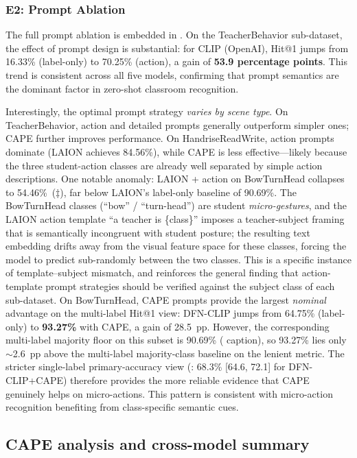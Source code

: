\documentclass[symmetry,article,submit,pdftex,moreauthors]{Definitions/mdpi}
\begin{document}
\subsubsection{E2: Prompt Ablation}
\label{sec:e2}

The full prompt ablation is embedded in .
On the TeacherBehavior sub-dataset, the effect of prompt design is substantial: for CLIP (OpenAI), Hit@1 jumps from 16.33\% (label-only) to 70.25\% (action), a gain of \textbf{53.9 percentage points}.
This trend is consistent across all five models, confirming that prompt semantics are the dominant factor in zero-shot classroom recognition.

Interestingly, the optimal prompt strategy \emph{varies by scene type}.
On TeacherBehavior, action and detailed prompts generally outperform simpler ones; CAPE further improves performance.
On HandriseReadWrite, action prompts dominate (LAION achieves 84.56\%), while CAPE is less effective---likely because the three student-action classes are already well separated by simple action descriptions.
One notable anomaly: LAION + action on BowTurnHead collapses to 54.46\%~($\ddagger$), far below LAION's label-only baseline of 90.69\%.
The BowTurnHead classes (``bow'' / ``turn-head'') are student \emph{micro-gestures}, and the LAION action template ``a teacher is \{class\}'' imposes a teacher-subject framing that is semantically incongruent with student posture; the resulting text embedding drifts away from the visual feature space for these classes, forcing the model to predict sub-randomly between the two classes.
This is a specific instance of template--subject mismatch, and reinforces the general finding that action-template prompt strategies should be verified against the subject class of each sub-dataset.
On BowTurnHead, CAPE prompts provide the largest \emph{nominal} advantage on the multi-label Hit@1 view: DFN-CLIP jumps from 64.75\% (label-only) to \textbf{93.27\%} with CAPE, a gain of 28.5~pp. However, the corresponding multi-label majority floor on this subset is 90.69\% ( caption), so 93.27\% lies only $\sim$2.6~pp above the multi-label majority-class baseline on the lenient metric. The stricter single-label primary-accuracy view (: 68.3\% [64.6, 72.1] for DFN-CLIP+CAPE) therefore provides the more reliable evidence that CAPE genuinely helps on micro-actions.
This pattern is consistent with micro-action recognition benefiting from class-specific semantic cues.

\subsection{CAPE analysis and cross-model summary}
\end{document}
